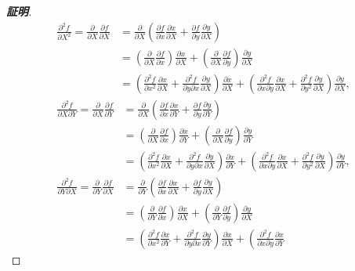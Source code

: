 \documentclass[11pt, a4paper, dvipdfmx]{jsarticle}
\theoremstyle{definition}
\newcommand{\p}{\partial}
\theoremstyle{mystyle}
\numberwithin{equation}{section} %
\begin{document}
\begin{proof}[\textbf{証明}]
    \begin{align*}
        \frac{\p^2 f}{\p X^2} 
        =\frac{\p}{\p X}\frac{\p f}{\p X}
        &=\frac{\p}{\p X}\left(
            \frac{\p f}{\p x}\frac{\p x}{\p X} 
            +\frac{\p f}{\p y}\frac{\p y}{\p X}
        \right)\\
        &=\left(
            \frac{\p}{\p X}\frac{\p f}{\p x}
        \right)\frac{\p x}{\p X}
        +\left(
            \frac{\p}{\p X}\frac{\p f}{\p y}
        \right)\frac{\p y}{\p X}\\
        &=\left(
            \frac{\p^2 f}{\p x^2}\frac{\p x}{\p X}
            +\frac{\p^2 f}{\p y\p x}\frac{\p y}{\p X}
        \right)\frac{\p x}{\p X}
        +\left(
            \frac{\p^2 f}{\p x\p y}\frac{\p x}{\p X}
            +\frac{\p^2 f}{\p y^2}\frac{\p y}{\p X}
        \right)\frac{\p y}{\p X},
    \end{align*}
    \begin{align*}
        \frac{\p^2 f}{\p X\p Y} 
        =\frac{\p}{\p X}\frac{\p f}{\p Y}
        &=\frac{\p}{\p X}\left(
            \frac{\p f}{\p x}\frac{\p x}{\p Y} 
            +\frac{\p f}{\p y}\frac{\p y}{\p Y}
        \right)\\
        &=\left(
            \frac{\p}{\p X}\frac{\p f}{\p x}
        \right)\frac{\p x}{\p Y}
        +\left(
            \frac{\p}{\p X}\frac{\p f}{\p y}
        \right)\frac{\p y}{\p Y}\\
        &=\left(
            \frac{\p^2 f}{\p x^2}\frac{\p x}{\p X}
            +\frac{\p^2 f}{\p y\p x}\frac{\p y}{\p X}
        \right)\frac{\p x}{\p Y}
        +\left(
            \frac{\p^2 f}{\p x\p y}\frac{\p x}{\p X}
            +\frac{\p^2 f}{\p y^2}\frac{\p y}{\p X}
        \right)\frac{\p y}{\p Y},\\
        \frac{\p^2 f}{\p Y\p X} 
        =\frac{\p}{\p Y}\frac{\p f}{\p X}
        &=\frac{\p}{\p Y}\left(
            \frac{\p f}{\p x}\frac{\p x}{\p X} 
            +\frac{\p f}{\p y}\frac{\p y}{\p X}
        \right)\\
        &=\left(
            \frac{\p}{\p Y}\frac{\p f}{\p x}
        \right)\frac{\p x}{\p X}
        +\left(
            \frac{\p}{\p Y}\frac{\p f}{\p y}
        \right)\frac{\p y}{\p X}\\
        &=\left(
            \frac{\p^2 f}{\p x^2}\frac{\p x}{\p Y}
            +\frac{\p^2 f}{\p y\p x}\frac{\p y}{\p Y}
        \right)\frac{\p x}{\p X}
        +\left(
            \frac{\p^2 f}{\p x\p y}\frac{\p x}{\p Y}

\end{align*}
\end{proof}
\end{document}

